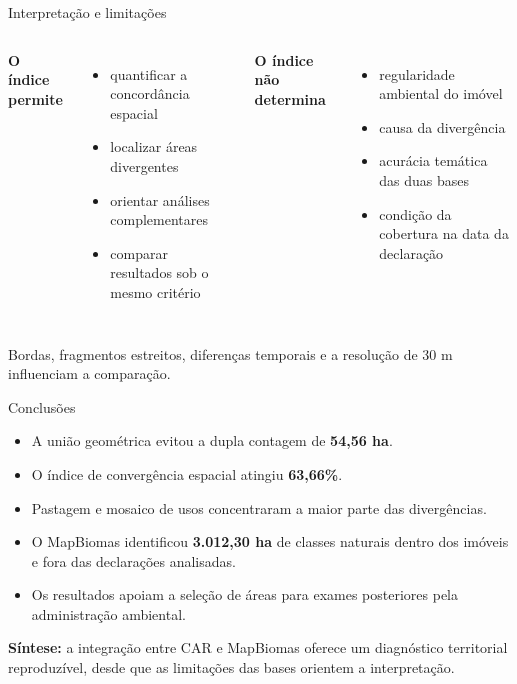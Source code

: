 \documentclass[aspectratio=169,10pt]{beamer}
\begin{document}
\begin{frame}{Interpretação e limitações}
  \vspace{0.20cm}
  \begin{columns}[T,onlytextwidth]
      \textbf{O índice permite}
      \begin{itemize}
        \item quantificar a concordância espacial
        \item localizar áreas divergentes
        \item orientar análises complementares
        \item comparar resultados sob o mesmo critério
      \end{itemize}
      \textbf{O índice não determina}
      \begin{itemize}
        \item regularidade ambiental do imóvel
        \item causa da divergência
        \item acurácia temática das duas bases
        \item condição da cobertura na data da declaração
      \end{itemize}
  \end{columns}

  \vspace{0.40cm}
  Bordas, fragmentos estreitos, diferenças temporais e a resolução de 30 m influenciam a comparação.
\end{frame}

\begin{frame}{Conclusões}
  \vspace{0.15cm}
  \begin{itemize}
    \item A união geométrica evitou a dupla contagem de \textbf{54,56 ha}.
    \item O índice de convergência espacial atingiu \textbf{63,66\%}.
    \item Pastagem e mosaico de usos concentraram a maior parte das divergências.
    \item O MapBiomas identificou \textbf{3.012,30 ha} de classes naturais dentro dos imóveis e fora das declarações analisadas.
    \item Os resultados apoiam a seleção de áreas para exames posteriores pela administração ambiental.
  \end{itemize}

  \vspace{0.45cm}
  \textbf{Síntese:} a integração entre CAR e MapBiomas oferece um diagnóstico territorial reproduzível, desde que as limitações das bases orientem a interpretação.
\end{frame}
\end{document}
